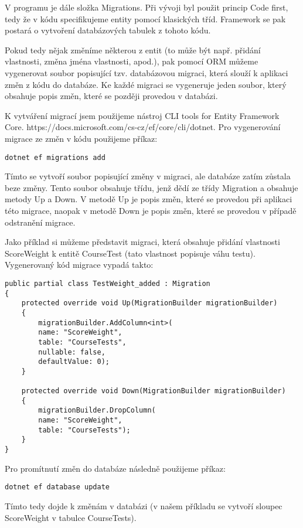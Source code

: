 V programu je dále složka Migrations. Při vývoji byl použit princip Code first, tedy že v kódu specifikujeme entity pomocí klasických tříd. Framework se pak postará o vytvoření databázových tabulek z tohoto kódu.

Pokud tedy nějak změníme některou z entit (to může být např. přidání vlastnosti, změna jména vlastnosti, apod.), pak pomocí ORM můžeme vygenerovat soubor popisující tzv. databázovou migraci, která slouží k aplikaci změn z kódu do databáze. Ke každé migraci se vygeneruje jeden soubor, který obsahuje popis změn, které se později provedou v databázi.

K vytváření migrací jsem použijeme nástroj CLI tools for Entity Framework Core. https://docs.microsoft.com/cs-cz/ef/core/cli/dotnet. Pro vygenerování migrace ze změn v kódu použijeme příkaz:

\begin{lstlisting}
dotnet ef migrations add 
\end{lstlisting}

Tímto se vytvoří soubor popisující změny v migraci, ale databáze zatím zůstala beze změny. Tento soubor obsahuje třídu, jenž dědí ze třídy Migration a obsahuje metody Up a Down. V metodě Up je popis změn, které se provedou při aplikaci této migrace, naopak v metodě Down je popis změn, které se provedou v případě odstranění migrace.

Jako příklad si můžeme představit migraci, která obsahuje přidání vlastnosti ScoreWeight k entitě CourseTest (tato vlastnost popisuje váhu testu).
Vygenerovaný kód migrace vypadá takto:

\begin{lstlisting}
public partial class TestWeight_added : Migration
{
	protected override void Up(MigrationBuilder migrationBuilder)
	{
		migrationBuilder.AddColumn<int>(
		name: "ScoreWeight",
		table: "CourseTests",
		nullable: false,
		defaultValue: 0);
	}
	
	protected override void Down(MigrationBuilder migrationBuilder)
	{
		migrationBuilder.DropColumn(
		name: "ScoreWeight",
		table: "CourseTests");
	}
}
\end{lstlisting}

Pro promítnutí změn do databáze následně použijeme příkaz:

\begin{lstlisting}
dotnet ef database update
\end{lstlisting}

Tímto tedy dojde k změnám v databázi (v našem příkladu se vytvoří sloupec ScoreWeight v tabulce CourseTests).

